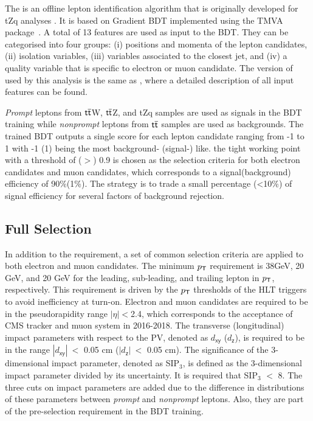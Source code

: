 The \TOP is an offline lepton identification algorithm that is originally developed for tZq analyses \cite{CMS:2018sgc,CMS:2021ugv}. It is based on Gradient \ac{BDT} implemented using the TMVA package~\cite{TMVA:2007ngy}. A total of 13 features are used as input to the \ac{BDT}. They can be categorised into four groups: (i) positions and momenta of the lepton candidates, (ii) isolation variables, (iii) variables associated to the closest jet, and (iv) a quality variable that is specific to electron or muon candidate. The version of \TOP used by this analysis is the same as \cite{CMS:2021ugv}, where a detailed description of all input features can be found.

\emph{Prompt} leptons from $\textsf{t}\overline{\textsf{t}}$W, $\textsf{t}\overline{\textsf{t}}$Z, and tZq samples are used as signals in the \ac{BDT} training while \emph{nonprompt} leptons from $\textsf{t}\overline{\textsf{t}}$ samples are used as backgrounds. The trained \ac{BDT} outputs a single score for each lepton candidate ranging from -1 to 1 with -1 (1) being the most background- (signal-) like. the tight working point with a threshold of ($>$) 0.9 is chosen as the selection criteria for both electron candidates and muon candidates, which corresponds to a signal(background) efficiency of 90\%(1\%). The strategy is to trade a small percentage (<10\%) of signal efficiency for several factors of background rejection. 
\subsection{Full Selection}
In addition to the \TOP requirement, a set of common selection criteria are applied to both electron and muon candidates. The minimum $p_{\textsf{T}}$ requirement is 38GeV, 20 GeV, and 20 GeV for the leading, sub-leading, and trailing lepton in $p_{\textsf{T}}$, respectively. This requirement is driven by the $p_{\textsf{T}}$ thresholds of the \ac{HLT} triggers to avoid inefficiency at turn-on. Electron and muon candidates are required to be in the pseudorapidity range $|\eta|<$2.4, which corresponds to the acceptance of \ac{CMS} tracker and muon system  in 2016-2018. The transverse (longitudinal) impact parameters with respect to the \ac{PV}, denoted as $d_{\textsf{xy}}$ ($d_{\textsf{z}}$), is required to be in the range $|d_{\textsf{xy}}|~<$ 0.05 cm ($|d_{\textsf{z}}|~<$ 0.05 cm). The significance of the 3-dimensional impact parameter, denoted as SIP$_3$, is defined as the 3-dimensional impact parameter divided by its uncertainty. It is required that SIP$_3$ $<$ 8. The three cuts on impact parameters are added due to the difference in distributions of these parameters between \emph{prompt} and \emph{nonprompt} leptons. Also, they are part of the pre-selection requirement in the \ac{BDT} training.

